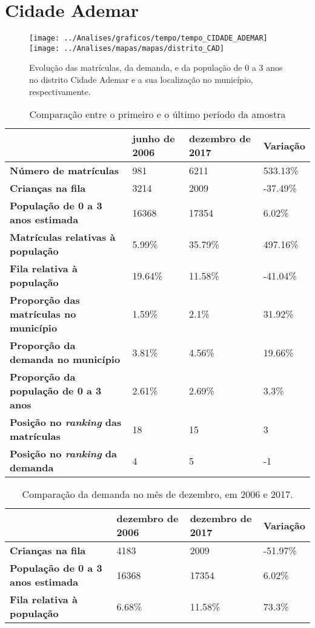 \section{Cidade Ademar}
\begin{figure}[H]
\centering
\texttt{[image: ../Analises/graficos/tempo/tempo\_CIDADE\_ADEMAR]}
\texttt{[image: ../Analises/mapas/mapas/distrito\_CAD]}
\caption{Evolução das matrículas, da demanda, e da população de 0 a 3 anos no distrito Cidade Ademar e a sua localização no município, respectivamente.}
\end{figure}
\begin{table}[H]
\begin{tabular}{l|l|l|l}
\textbf{}                                      & \textbf{junho de 2006}       & \textbf{dezembro de 2017}    & \textbf{Variação} \\ \hline
\textbf{Número de matrículas}                  & 981 & 6211 & 533.13\% \\ \hline
\textbf{Crianças na fila}                      & 3214 & 2009 & -37.49\% \\ \hline
\textbf{População de 0 a 3 anos estimada}      & 16368 & 17354 & 6.02\% \\ \hline
\textbf{Matrículas relativas à população}      & 5.99\% & 35.79\% & 497.16\% \\ \hline
\textbf{Fila relativa à população}             & 19.64\% & 11.58\% & -41.04\% \\ \hline
\textbf{Proporção das matrículas no município} & 1.59\% & 2.1\% & 31.92\% \\ \hline
\textbf{Proporção da demanda no município}     & 3.81\% & 4.56\% & 19.66\% \\ \hline
\textbf{Proporção da população de 0 a 3 anos}  & 2.61\% & 2.69\% & 3.3\% \\ \hline
\textbf{Posição no \textit{ranking} das matrículas}     & 18 & 15 & 3 \\ \hline
\textbf{Posição no \textit{ranking} da demanda}         & 4 & 5 & -1 \\ 
\end{tabular}
\caption{Comparação entre o primeiro e o último período da amostra}
\end{table}
\begin{table}[H]
\begin{tabular}{l|l|l|l}
\textbf{}                                 & \textbf{dezembro de 2006} & \textbf{dezembro de 2017} & \textbf{Variação} \\ \hline
\textbf{Crianças na fila}                      & 4183 & 2009 & -51.97\% \\ \hline
\textbf{População de 0 a 3 anos estimada}      & 16368 & 17354 & 6.02\% \\ \hline
\textbf{Fila relativa à população}             & 6.68\% & 11.58\% & 73.3\% \\
\end{tabular}
\caption{Comparação da demanda no mês de dezembro, em 2006 e 2017.}
\end{table}
